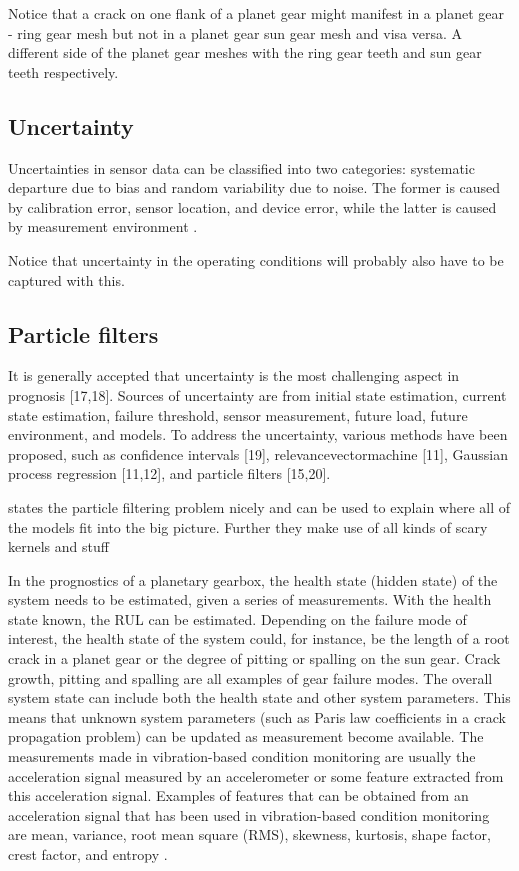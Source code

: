 Notice that a crack on one flank of a planet gear might manifest in a planet gear - ring gear mesh but not in a planet gear sun gear mesh and visa versa. A different side of the planet gear meshes with the ring gear teeth and sun gear teeth respectively. \cite{Lei2016}

\subsection{Uncertainty}

Uncertainties in sensor data can be classified into two categories: systematic departure due to bias and random variability due to noise. The former is caused by calibration error, sensor location, and device error, while the latter is caused by measurement environment \cite{Coppe2010}.



Notice that uncertainty in the operating conditions will probably also have to be captured with this.



\subsection{Particle filters}


\cite{Coppe2010}
It is generally accepted that uncertainty is the most challenging
aspect in prognosis [17,18]. Sources of uncertainty are from initial state estimation, current state estimation, failure threshold, sensor measurement, future load, future environment, and models. To address the uncertainty, various methods have been proposed, such as confidence intervals [19], relevancevectormachine [11], Gaussian process regression [11,12], and particle filters [15,20].



\cite{Orchard2008} states the particle filtering problem nicely and can be used to explain where all of the models fit into the big picture. Further they make use of all kinds of scary kernels and stuff 



In the prognostics of a planetary gearbox, the health state (hidden state) of the system needs to be estimated, given a series of measurements. With the health state known, the RUL can be estimated. Depending on the failure mode of interest, the health state of the system could, for instance, be the length of a root crack in a planet gear or the degree of pitting or spalling on the sun gear. Crack growth, pitting and spalling are all examples of gear failure modes. The overall system state can include both the health state and other system parameters. This means that unknown system parameters (such as Paris law coefficients in a crack propagation problem) can be updated as measurement become available. The measurements made in vibration-based condition monitoring are usually the acceleration signal measured by an accelerometer or some feature extracted from this acceleration signal. Examples of features that can be obtained from an acceleration signal that has been used in vibration-based condition monitoring are mean, variance, root mean square (RMS), skewness, kurtosis, shape factor, crest factor, and entropy \cite{Caesarendra2017}.

